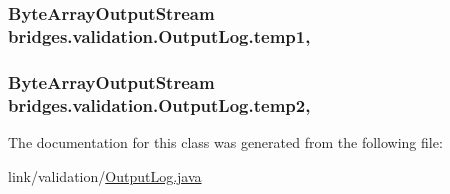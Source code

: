 \subsubsection[{temp1}]{\setlength{\rightskip}{0pt plus 5cm}Byte\+Array\+Output\+Stream bridges.\+validation.\+Output\+Log.\+temp1\hspace{0.3cm}{\ttfamily [static]}, {\ttfamily [protected]}}\label{classbridges_1_1validation_1_1_output_log_a142611812dd1ea095c4a1274bd40a93a}
\hypertarget{classbridges_1_1validation_1_1_output_log_ab1f0ab7e9ada60f29c4c4f59694c1163}{}
\subsubsection[{temp2}]{\setlength{\rightskip}{0pt plus 5cm}Byte\+Array\+Output\+Stream bridges.\+validation.\+Output\+Log.\+temp2\hspace{0.3cm}{\ttfamily [static]}, {\ttfamily [protected]}}\label{classbridges_1_1validation_1_1_output_log_ab1f0ab7e9ada60f29c4c4f59694c1163}


The documentation for this class was generated from the following file\+:\begin{DoxyCompactItemize}
\item 
link/validation/\hyperlink{_output_log_8java}{Output\+Log.\+java}\end{DoxyCompactItemize}
